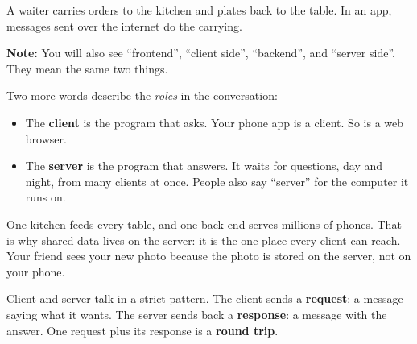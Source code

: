 \noindent{}A waiter carries orders to the kitchen and plates back to the table. In an app, messages sent over the internet do the carrying.

\begin{notebox}

\textbf{Note:} You will also see ``frontend'', ``client side'', ``backend'', and ``server side''. They mean the same two things.

\end{notebox}

\label{webapp-01:client-and-server}

Two more words describe the \emph{roles} in the conversation:

\begin{itemize}
\tightlist
\item
  The \textbf{client} is the program that asks. Your phone app is a client. So is a web browser.
\item
  The \textbf{server} is the program that answers. It waits for questions, day and night, from many clients at once. People also say ``server'' for the computer it runs on.
\end{itemize}

\noindent{}One kitchen feeds every table, and one back end serves millions of phones. That is why shared data lives on the server: it is the one place every client can reach. Your friend sees your new photo because the photo is stored on the server, not on your phone.

\label{webapp-01:the-request-and-response-loop}

Client and server talk in a strict pattern. The client sends a \textbf{request}: a message saying what it wants. The server sends back a \textbf{response}: a message with the answer. One request plus its response is a \textbf{round trip}.

\begin{codebox}[short]

\begin{Shaded}
\begin{Highlighting}[]
\end{Highlighting}
\end{Shaded}

\end{codebox}

